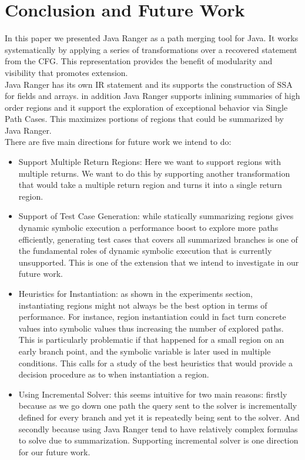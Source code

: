 \section{Conclusion and Future Work}
\label{sec:future}

In this paper we presented Java Ranger as a path merging tool for Java. 
%
It works systematically by applying a series of transformations over a recovered statement from the CFG. This representation provides the benefit of modularity and visibility that promotes extension. \\
%
Java Ranger has its own IR statement and its supports the construction of SSA for fields and arrays.
%
in addition Java Ranger supports inlining summaries of high order regions and it support the exploration of exceptional behavior via Single Path Cases. 
%
This maximizes portions of regions that could be summarized by Java Ranger. \\
%
There are five main directions for future work we intend to do:
\begin{itemize}
\item Support Multiple Return Regions:  Here we want to support regions with multiple returns. 
%
We want to do this by supporting another transformation that would take a multiple return region and turns it into a single return region. 

\item Support of Test Case Generation: while statically summarizing regions gives dynamic symbolic execution a performance boost to explore more paths efficiently, generating test cases that covers all summarized branches is one of the fundamental roles of dynamic symbolic execution that is currently unsupported. 
%
This is one of the extension that we intend to investigate in our future work. 
%

\item Heuristics for Instantiation: as shown in the experiments section, instantiating regions might not always be the best option in terms of performance.
%
For instance, region instantiation could in fact turn concrete values into symbolic values thus increasing the number of explored paths. 
%
This is particularly problematic if that happened for a small region on an early branch point, and the symbolic variable is later used in multiple conditions.
%
This calls for a study of the best heuristics that would provide a decision procedure as to when instantiation a region.

\item Using Incremental Solver: this seems intuitive for two main reasons: firstly because as we go down one path the query sent to the solver is incrementally defined for every branch and yet it is repeatedly being sent to the solver. 
%
And secondly because using Java Ranger tend to have relatively complex formulas to solve due to summarization. 
%
Supporting incremental solver is one direction for our future work. 
%
\end{itemize}



